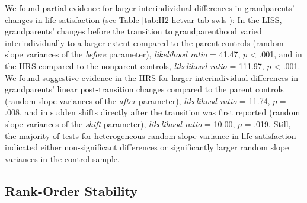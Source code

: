 \documentclass[
  english,
  man, noextraspace]{apa7}
\begin{document}
We found partial evidence for larger interindividual differences in grandparents' changes in life satisfaction (see Table \ref{tab:H2-hetvar-tab-swls}): In the LISS, grandparents' changes before the transition to grandparenthood varied interindividually to a larger extent compared to the parent controls (random slope variances of the \emph{before} parameter), \emph{likelihood ratio} = 41.47, \(p\) \textless{} .001, and in the HRS compared to the nonparent controls, \emph{likelihood ratio} = 111.97, \(p\) \textless{} .001. We found suggestive evidence in the HRS for larger interindividual differences in grandparents' linear post-transition changes compared to the parent controls (random slope variances of the \emph{after} parameter), \emph{likelihood ratio} = 11.74, \(p\) = .008, and in sudden shifts directly after the transition was first reported (random slope variances of the \emph{shift} parameter), \emph{likelihood ratio} = 10.00, \(p\) = .019. Still, the majority of tests for heterogeneous random slope variance in life satisfaction indicated either non-significant differences or significantly larger random slope variances in the control sample.

\hypertarget{rank-order-stability}{%
\subsection{Rank-Order Stability}\label{rank-order-stability}}
\end{document}
